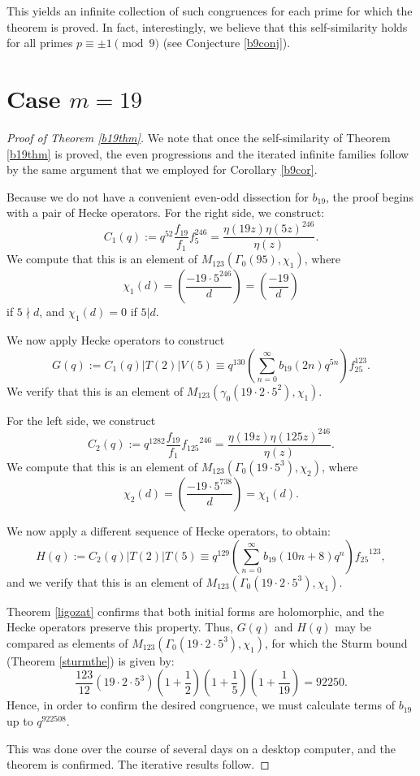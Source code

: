 \documentclass[12pt]{amsart}
\theoremstyle{definition}
\begin{document}
This yields an infinite collection of such congruences for each prime for which the theorem is proved.  In fact, interestingly, we believe that this self-similarity holds for all primes $p \equiv \pm 1 \pmod{9}$ (see Conjecture \ref{b9conj}).


\section{Case $m=19$}

\begin{proof}[Proof of Theorem \ref{b19thm}] We note that once the self-similarity of Theorem \ref{b19thm} is proved, the even progressions and the  iterated infinite families follow by the same argument that we employed for Corollary \ref{b9cor}.

Because we do not have a convenient even-odd dissection for $b_{19}$, the proof begins with a pair of Hecke operators. For the right side, we construct:
$$C_1(q) := q^{52} \frac{f_{19}}{f_1} f_5^{246} = \frac{\eta(19z) \eta(5z)^{246}}{\eta(z)}.$$
We compute that this is an element of $M_{123}(\Gamma_0(95),\chi_1)$, where
$$\chi_1(d) = \left( \frac{-19 \cdot 5^{246}}{d} \right) = \left(\frac{-19}{d}\right)$$
if $5 \nmid d$, and $\chi_1(d)=0$ if $5 \vert d$.

We now apply Hecke operators to construct $$G(q) := C_1(q) \vert T(2) \vert V(5) \equiv q^{130} \left( \sum_{n=0}^\infty b_{19} (2n) q^{5n} \right) f_{25}^{123}.$$
We verify that this is an element of $M_{123}(\gamma_0(19 \cdot 2 \cdot 5^2),\chi_1)$.

For the left side, we construct $$C_2(q) := q^{1282} \frac{f_{19}}{f_1} {f_{125}}^{246} = \frac{\eta(19z) \eta(125z)^{246}}{\eta(z)}.$$
We compute that this is an element of $M_{123}(\Gamma_0(19 \cdot 5^3), \chi_2)$, where
$$\chi_2(d) = \left( \frac{-19 \cdot 5^{738}}{d} \right) = \chi_1(d).$$

We now apply a different sequence of Hecke operators, to obtain: $$H(q) := C_2(q) \vert T(2) \vert T(5) \equiv q^{129} \left( \sum_{n=0}^\infty b_{19}(10n+8) q^n \right) {f_{25}}^{123},$$ \noindent and we verify that this is an element of $M_{123}(\Gamma_0(19 \cdot 2 \cdot 5^3), \chi_1)$.

Theorem \ref{ligozat} confirms that both initial forms are holomorphic, and the Hecke operators preserve this property.  Thus, $G(q)$ and $H(q)$ may be compared as elements of $M_{123}(\Gamma_0(19 \cdot 2 \cdot 5^3), \chi_1)$, for which the Sturm bound (Theorem \ref{sturmthe}) is given by:
$$\frac{123}{12} (19 \cdot 2 \cdot 5^3)  \left(1 +  \frac{1}{2} \right) \left(1+ \frac{1}{5} \right) \left(1+ \frac{1}{19} \right) = 92250.$$
Hence, in order to confirm the desired congruence, we must calculate terms of $b_{19}$ up to $q^{922508}$.

This was done over the course of several days on a desktop computer, and the theorem is confirmed.  The iterative results follow. \end{proof}
\end{document}
